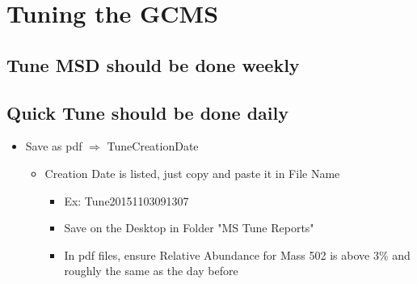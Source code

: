 \documentclass[letterpaper,11pt]{article}
\begin{document}
\section{Tuning the GCMS}
	\subsection{Tune MSD should be done weekly}
    \subsection{Quick Tune should be done daily}
    	\begin{itemize}
    	\item Save as pdf $\Longrightarrow$ TuneCreationDate
        	\begin{itemize}
        	\item Creation Date is listed, just copy and paste it in File Name
            	\begin{itemize}
            	\item Ex: Tune20151103091307
            \item Save on the Desktop in Folder "MS Tune Reports"
            \item In pdf files, ensure Relative Abundance for Mass 502 is above 3\% and roughly the same as the day before
            	\end{itemize}
        	\end{itemize}
    	\end{itemize}
        
\end{document}
